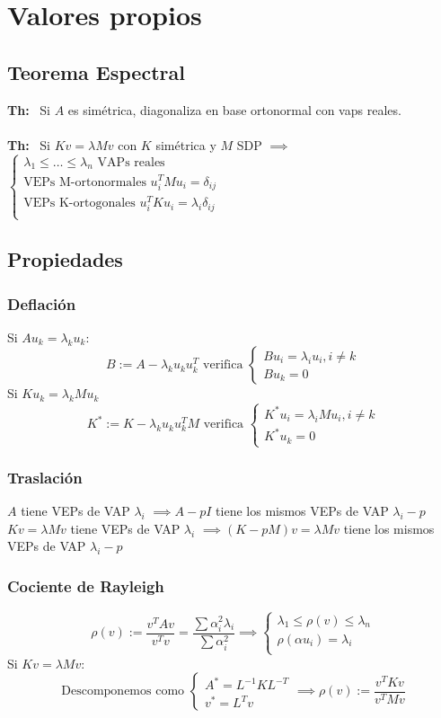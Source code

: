 \documentclass[leqno]{article}
\renewcommand{\th}{\textbf{Th:} \ }
\begin{document}
\section{Valores propios}
\subsection{Teorema Espectral}
\th Si $A$ es simétrica, diagonaliza en base ortonormal con vaps reales. \\
\\
\th Si $Kv=\lambda Mv$ con $K$ simétrica y $M$ SDP $\implies$  $\begin{cases}
    \lambda_1 \leq \ldots \leq \lambda_n \text{ VAPs reales} \\
    \text{VEPs M-ortonormales } u_i^TMu_i=\delta_{ij} \\
    \text{VEPs K-ortogonales } u_i^TKu_i=\lambda_i\delta_{ij} \\
\end{cases}$

\subsection{Propiedades}
\subsubsection{Deflación}
Si $Au_k = \lambda_ku_k$:
$$
B:=A-\lambda_ku_ku_k^T  \text{ verifica } \begin{cases}
    Bu_i=\lambda_iu_i, i\neq k \\ Bu_k=0
\end{cases}
$$
Si $Ku_k = \lambda_kMu_k$
$$
K^*:=K-\lambda_ku_ku_k^TM  \text{ verifica } \begin{cases}
    K^*u_i=\lambda_iMu_i, i\neq k \\ K^*u_k=0
\end{cases}
$$
\subsubsection{Traslación}
$A$ tiene VEPs de VAP $\lambda_i$ $\implies A-pI$ tiene los mismos VEPs de VAP $\lambda_i - p$ \\
$Kv=\lambda Mv$ tiene VEPs de VAP $\lambda_i$ $\implies (K-pM)v=\lambda Mv$ tiene los mismos VEPs de VAP $\lambda_i - p$

\subsubsection{Cociente de Rayleigh}
$$
\rho(v) := \dfrac{v^TAv}{v^Tv} = \dfrac{\sum \alpha_i^2\lambda_i}{\sum \alpha_i^2} \implies \begin{cases}
    \lambda_1\leq \rho(v)\leq \lambda_n\\
    \rho(\alpha u_i)=\lambda_i \\
\end{cases}
$$
Si $Kv=\lambda Mv$:
$$
\text{Descomponemos como }\begin{cases}
    A^*=L^{-1}KL^{-T} \\
    v^*=L^Tv
\end{cases} \implies \rho(v) := \dfrac{v^TKv}{v^TMv}
$$
\end{document}
